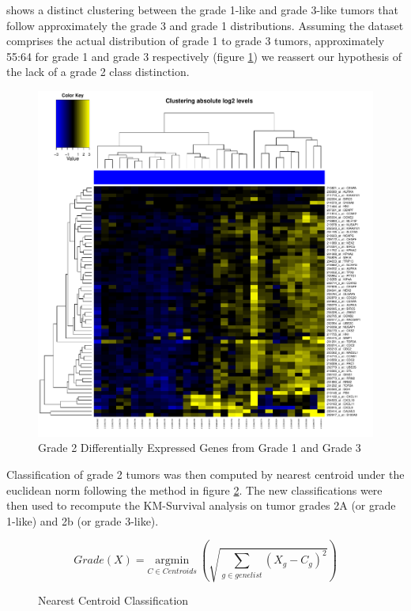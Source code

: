 \documentclass[a4paper,10pt]{article}
\begin{document}
shows a distinct clustering between the grade 1-like and grade 3-like tumors that follow approximately 
the grade 3 and grade 1 distributions. Assuming the dataset comprises the actual distribution 
of grade 1 to grade 3 tumors, approximately 55:64 for grade 1 and grade 3 respectively (figure \ref{grade2up}) we reassert our hypothesis
of the lack of a grade 2 class distinction.
\begin{figure}
\centering
\includegraphics[scale=0.50]{docs/grade2onupregulated3}
\caption{Grade 2 Differentially Expressed Genes from Grade 1 and Grade 3}\label{grade2up}
\end{figure}

Classification of grade 2 tumors was then computed by nearest centroid under the euclidean norm following the method in figure \ref{classify}.
The new classifications were then used to recompute the KM-Survival analysis on tumor grades 2A (or grade 1-like) and 2b (or grade 3-like).

\begin{figure}
 $$
Grade(X) = \underset{C \in Centroids} {\mathrm{argmin}} ~ \left( \sqrt{\sum_{g\in genelist}{ (X_{g} - C_{g})^2}}\right)
$$
\caption{Nearest Centroid Classification}\label{classify}
\end{figure}
\end{document}

